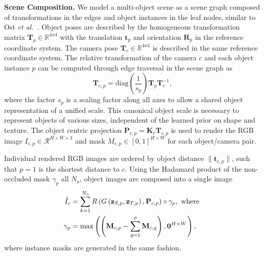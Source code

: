 \vspace{0.5\baselineskip}
\noindent \textbf{Scene Composition.} We model a multi-object scene as a scene graph composed of transformations in the edges and object instances in the leaf nodes, similar to Ost \emph{et al.}~\cite{ost2021neural}. Object poses are described by the homogeneous transformation matrix $\mathbf{T}_{p} \in \mathbb{R}^{4x4}$ with the translation $\mathbf{t}_{p}$ and orientation $\mathbf{R}_{p}$ in the reference coordinate system. The camera pose $\mathbf{T}_{c} \in \mathbb{R}^{4x4}$ is described in the same reference coordinate system. The relative transformation of the camera $c$ and each object instance $p$ can be computed through edge traversal in the scene graph as
\begin{equation}\label{eq:camera_to_obj}
    \mathbf{T}_{c,p} = \text{diag}\left(\frac{1}{s_{p}}\right)\mathbf{T}_{p}\mathbf{T}_{c}^{-1},
\end{equation}
%
where the factor $s_{p}$ is a scaling factor along all axes to allow a shared object representation of a unified scale. This canonical object scale is necessary to represent objects of various sizes, independent of the learned prior on shape and texture. The object centric projection $\mathbf{P}_{c,p} = \mathbf{K}_c \mathbf{T}_{c,p} $ is used to render the RGB image $I_{c,p} \in \mathcal{R}^{H \times W \times 3}$ and mask $M_{c, p} \in \left[0, 1 \right]^{H \times W}$ for each object/camera pair. 

Individual rendered RGB images are ordered by object distance $\| \mathbf{t}_{c, p} \|$, such that $p=1$ is the shortest distance to $c$. Using the Hadamard product of the non-occluded mask $\gamma_p$ all $N_o $, object images are composed into a single image
\begin{equation}\label{eq:forward_scene}
    \begin{aligned}
            \hat I_c &= \sum_{k = 1}^{N_o} R\left( G\left( \mathbf{z}_{S,p}, \mathbf{z}_{T,p} \right), \mathbf{P}_{c,p}\right) \circ \mathbf{\gamma}_p, \text{\,\,where  } \\        
             \mathbf{\gamma}_p  & = \max \left( \left( \mathbf{M}_{c, p} - \sum_{q=1}^{p} \mathbf{M}_{c,q} \right), \mathbf{0}^{H\times W} \right),
    \end{aligned}
\end{equation}
where instance masks are generated in the same fashion. 

